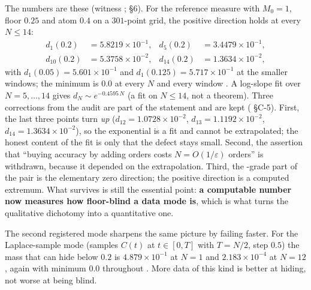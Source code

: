 The numbers are these (witness ;
 \S6). For the reference measure with $M_0=1$, floor $0.25$ and atom $0.4$
on a $301$-point grid, the positive direction holds at every $N\le14$:
\begin{align*}
  d_1(0.2)&=5.8219\times10^{-1}, & d_5(0.2)&=3.4479\times10^{-1},\\
  d_{10}(0.2)&=5.3758\times10^{-2}, & d_{14}(0.2)&=1.3634\times10^{-2},
\end{align*}
with $d_1(0.05)=5.601\times10^{-1}$ and $d_1(0.125)=5.717\times10^{-1}$ at the smaller windows; the
minimum is $0.0$ at every $N$ and every window \LT. A log-slope fit over $N=5,\ldots,14$ gives
$d_N\sim e^{-0.4595\,N}$ \LE{} (a fit on $N\le14$, not a theorem). Three corrections from the audit
are part of the statement and are kept
( \S C-5). First, the last three points turn \emph{up}
($d_{12}=1.0728\times10^{-2}$, $d_{13}=1.1192\times10^{-2}$, $d_{14}=1.3634\times10^{-2}$), so the
exponential is a fit and cannot be extrapolated; the honest content of the fit is only that the
defect stays small. Second, the assertion that ``buying accuracy by adding orders costs
$N=O(1/\varepsilon)$ orders'' is withdrawn, because it depended on the extrapolation. Third, the
\LT-grade part of the pair is the elementary zero direction; the positive direction is a computed
extremum. What survives is still the essential point: \textbf{a computable number now measures how
floor-blind a data mode is}, which is what turns the qualitative dichotomy into a quantitative one.

The second registered mode sharpens the same picture by failing faster. For the Laplace-sample mode
(samples $C(t)$ at $t\in[0,T]$ with $T=N/2$, step $0.5$) the mass that can hide below $0.2$ is
$4.879\times10^{-1}$ at $N=1$ and $2.183\times10^{-4}$ at $N=12$, again with minimum $0.0$
throughout \LE. More data of this kind is better at hiding, not worse at being blind.

